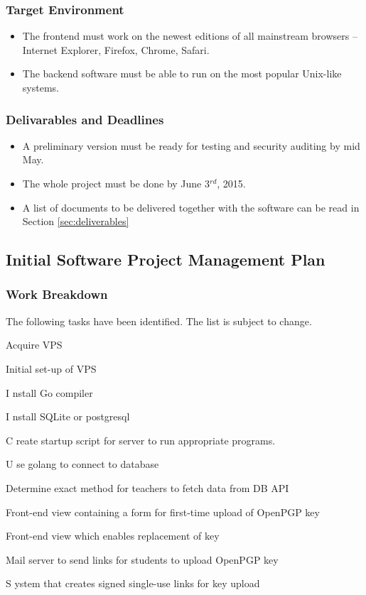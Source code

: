 \documentclass[11pt,a4paper]{report}
\let\OldItem\item
\newcommand{\SubItemStart}[1]{%
    \let\item\SubItemEnd
    \begin{SubItemList}[resume]%
        \OldItem #1%
}
\newcommand{\SubItemMiddle}[1]{%
    \OldItem #1%
}
\newcommand{\SubItemEnd}[1]{%
    \end{SubItemList}%
    \let\item\OldItem
    \item #1%
}
\newcommand*{\SubItem}[1]{%
    \let\SubItem\SubItemMiddle%
    \SubItemStart{#1}%
}%
\begin{document}
\subsubsection{Target Environment}
\begin{itemize}
\item The frontend must work on the newest editions of all mainstream browsers -- Internet Explorer, Firefox, Chrome, Safari.
\item The backend software must be able to run on the most popular Unix-like systems.
\end{itemize}
\subsubsection{Delivarables and Deadlines}\label{sec:deadlines}
\begin{itemize}
\item A preliminary version must be ready for testing and security auditing by mid May.
\item The whole project must be done by June 3$^{rd}$, 2015.
\item A list of documents to be delivered together with the software can be read in Section \ref{sec:deliverables}
\end{itemize}
\subsection{Initial Software Project Management Plan}
\subsubsection{Work Breakdown}
The following tasks have been identified. The list is subject to change.
\begin{itemize}
\item Acquire VPS
\item Initial set-up of VPS
\SubItem Install Go compiler
\SubItem Install SQLite or postgresql
\SubItem Create startup script for server to run appropriate programs.
\item Use golang to connect to database
\item Determine exact method for teachers to fetch data from DB API
\item Front-end view containing a form for first-time upload of OpenPGP key
\item Front-end view which enables replacement of key
\item Mail server to send links for students to upload OpenPGP key
\SubItem System that creates signed single-use links for key upload
\end{itemize}
\end{document}
